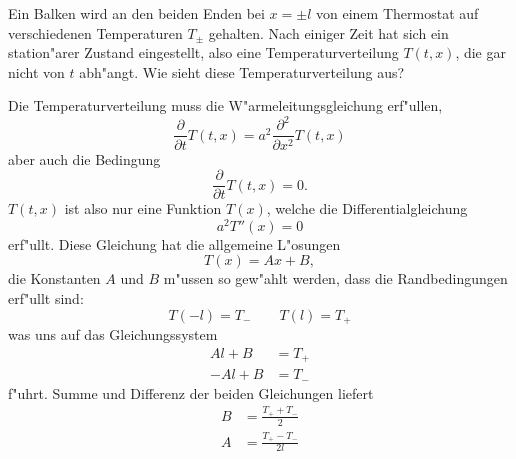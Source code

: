 Ein Balken wird an den beiden Enden bei $x=\pm l$ von einem Thermostat
auf verschiedenen Temperaturen $T_\pm$ gehalten. Nach einiger Zeit
hat sich ein station"arer Zustand eingestellt, also eine Temperaturverteilung
$T(t,x)$, die gar nicht von $t$ abh"angt. Wie sieht diese Temperaturverteilung
aus?

\begin{loesung}
Die Temperaturverteilung muss die W"armeleitungsgleichung erf"ullen,
\[
\frac{\partial}{\partial t}T(t,x)=
a^2\frac{\partial^2}{\partial x^2}T(t,x)
\]
aber auch die Bedingung
\[
\frac{\partial}{\partial t}T(t,x)=0.
\]
$T(t,x)$ ist also nur eine Funktion $T(x)$, welche die Differentialgleichung
\[
a^2T''(x)=0
\]
erf"ullt. Diese Gleichung hat die allgemeine L"osungen
\[
T(x)=Ax+B,
\]
die Konstanten $A$ und $B$ m"ussen so gew"ahlt werden, dass
die Randbedingungen erf"ullt sind:
\[
T(-l)=T_-\qquad T(l)=T_+
\]
was uns auf das Gleichungssystem
\begin{align*}
Al+B&=T_+\\
-Al+B&=T_-
\end{align*}
f"uhrt.
Summe und Differenz der beiden Gleichungen liefert
\begin{align*}
B&=\frac{T_++T_-}{2}
\\
A&=\frac{T_+-T_-}{2l}
\end{align*}
\end{loesung}
